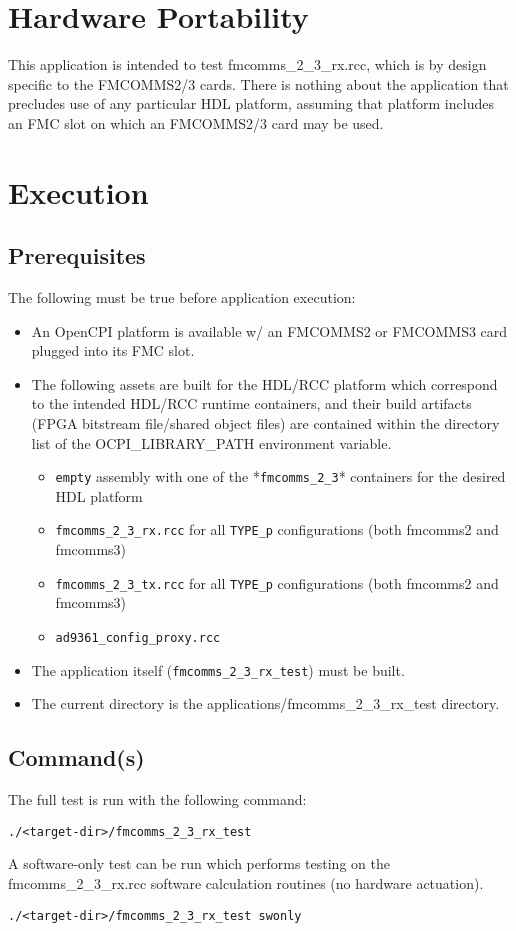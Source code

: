 \section{Hardware Portability}
This application is intended to test fmcomms\_2\_3\_rx.rcc, which is by design specific to the FMCOMMS2/3 cards. There is nothing about the application that precludes use of any particular HDL platform, assuming that platform includes an FMC slot on which an FMCOMMS2/3 card may be used.

\section{Execution}
\subsection{Prerequisites}
The following must be true before application execution:
\begin{itemize}
  \item An OpenCPI platform is available w/ an FMCOMMS2 or FMCOMMS3 card plugged into its FMC slot.
  \item The following assets are built for the HDL/RCC platform which correspond to the intended HDL/RCC runtime containers, and their build artifacts (FPGA bitstream file/shared object files) are contained within the directory list of the OCPI\_LIBRARY\_PATH environment variable.
  \begin{itemize}
    \item \verb+empty+ assembly with one of the *\verb+fmcomms_2_3+* containers for the desired HDL platform
    \item \verb+fmcomms_2_3_rx.rcc+ for all \verb+TYPE_p+ configurations (both fmcomms2 and fmcomms3)
    \item \verb+fmcomms_2_3_tx.rcc+ for all \verb+TYPE_p+ configurations (both fmcomms2 and fmcomms3)
    \item \verb+ad9361_config_proxy.rcc+
  \end{itemize}
  \item The application itself (\verb+fmcomms_2_3_rx_test+) must be built.
  \item The current directory is the applications/fmcomms\_2\_3\_rx\_test directory.
\end{itemize}
\subsection{Command(s)}
The full test is run with the following command:
\begin{lstlisting}
./<target-dir>/fmcomms_2_3_rx_test
\end{lstlisting}
A software-only test can be run which performs testing on the fmcomms\_2\_3\_rx.rcc software calculation routines (no hardware actuation).
\begin{lstlisting}
./<target-dir>/fmcomms_2_3_rx_test swonly
\end{lstlisting}
